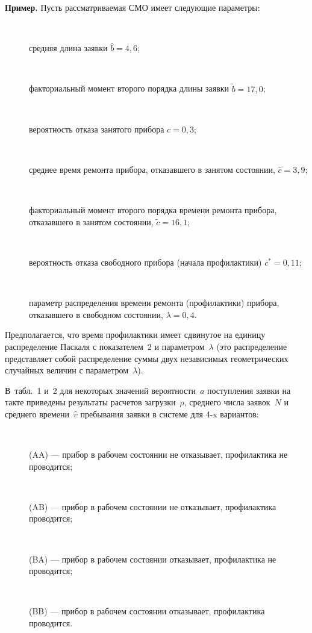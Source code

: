 \begin{multicols}{2}


\noindent
\textbf{Пример.}
Пусть рассматриваемая СМО имеет следующие параметры:
\begin{description}
\item[\,]
средняя длина заявки $\hat b=4{,}6$;\\[-14pt]
\item[\,]
факториальный момент второго порядка длины заявки $\tilde b=17{,}0$;\\[-14pt]
\item[\,]
вероятность отказа занятого прибора $c=0{,}3$;\\[-14pt]
\item[\,]
среднее время ремонта прибора, отказавшего в занятом
состоянии, $\hat c=3{,}9$;\\[-14pt]
\item[\,]
факториальный момент второго порядка времени ремонта
прибора, отказавшего в занятом состоянии, $\tilde c=16{,}1$;\\[-14pt]
\item[\,]
вероятность отказа свободного прибора (начала
профилактики) $c^*=0{,}11$;\\[-14pt]
\item[\,]
параметр распределения времени ремонта (профилактики)
прибора, отказавшего в свободном состоянии, $\lambda=0{,}4$.
\end{description}

Предполагается, что время профилактики имеет сдвинутое
на единицу распределение Паскаля с показателем~2 и
параметром~$\lambda$ (это распределение представляет
собой распределение суммы двух независимых геометрических
случайных величин с параметром~$\lambda$).

В~табл.~1 и~2 для некоторых значений вероятности~$a$
поступления заявки на такте приведены результаты расчетов
загрузки~$\rho$, среднего числа заявок~$N$ и среднего
времени~$\hat v$ пребывания заявки в системе для 4-x вариантов:
\begin{description}
\item[\,]
(AA) --- прибор в рабочем состоянии не отказывает, профилактика
не проводится;\\[-14pt]
\item[\,]
(AB) --- прибор в рабочем состоянии не отказывает, профилактика
проводится;\\[-14pt]
\item[\,]
(BA) --- прибор в рабочем состоянии отказывает, профилактика
не проводится;\\[-14pt]
\item[\,]
(BB) --- прибор в рабочем состоянии отказывает, профилактика
проводится.
\end{description}


\end{multicols}

